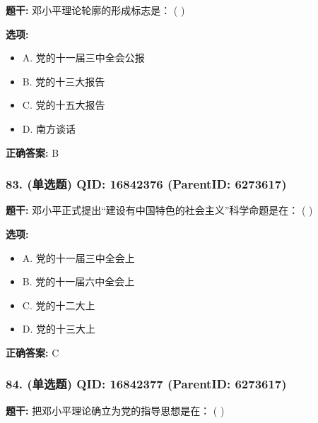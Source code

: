 \documentclass[12pt,UTF8]{ctexart}
\begin{document}
\textbf{题干:}
邓小平理论轮廓的形成标志是： ( )



\textbf{选项:}
\begin{itemize}[leftmargin=*]

  \item A. 党的十一届三中全会公报

  \item B. 党的十三大报告

  \item C. 党的十五大报告

  \item D. 南方谈话

\end{itemize}

\textbf{正确答案:}
B

\vspace{0.3em}\hrulefill\vspace{0.7em}

\subsubsection*{83. (单选题) \small QID: 16842376 (ParentID: 6273617)}

\textbf{题干:}
邓小平正式提出“建设有中国特色的社会主义”科学命题是在： ( )



\textbf{选项:}
\begin{itemize}[leftmargin=*]

  \item A. 党的十一届三中全会上

  \item B. 党的十一届六中全会上

  \item C. 党的十二大上

  \item D. 党的十三大上

\end{itemize}

\textbf{正确答案:}
C

\vspace{0.3em}\hrulefill\vspace{0.7em}

\subsubsection*{84. (单选题) \small QID: 16842377 (ParentID: 6273617)}

\textbf{题干:}
把邓小平理论确立为党的指导思想是在： ( )
\end{document}
